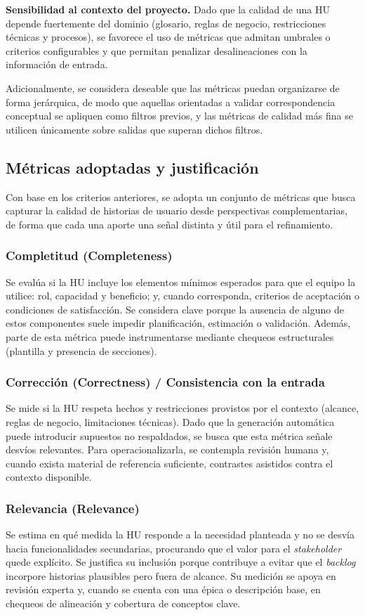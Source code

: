 \textbf{Sensibilidad al contexto del proyecto.} Dado que la calidad de una HU
depende fuertemente del dominio (glosario, reglas de negocio, restricciones
técnicas y procesos), se favorece el uso de métricas que admitan umbrales o
criterios configurables y que permitan penalizar desalineaciones con la
información de entrada.

Adicionalmente, se considera deseable que las métricas puedan organizarse de
forma jerárquica, de modo que aquellas orientadas a validar correspondencia
conceptual se apliquen como filtros previos, y las métricas de calidad más fina
se utilicen únicamente sobre salidas que superan dichos filtros.

\subsection{Métricas adoptadas y justificación}
Con base en los criterios anteriores, se adopta un conjunto de métricas que busca capturar la calidad de historias de usuario desde perspectivas complementarias, de forma que cada una aporte una señal distinta y útil para el refinamiento.

\subsubsection{Completitud (Completeness)}
Se evalúa si la HU incluye los elementos mínimos esperados para que el equipo la utilice: rol, capacidad y beneficio; y, cuando corresponda, criterios de aceptación o condiciones de satisfacción. Se considera clave porque la ausencia de alguno de estos componentes suele impedir planificación, estimación o validación. Además, parte de esta métrica puede instrumentarse mediante chequeos estructurales (plantilla y presencia de secciones).

\subsubsection{Corrección (Correctness) / Consistencia con la entrada}
Se mide si la HU respeta hechos y restricciones provistos por el contexto (alcance, reglas de negocio, limitaciones técnicas). Dado que la generación automática puede introducir supuestos no respaldados, se busca que esta métrica señale desvíos relevantes. Para operacionalizarla, se contempla revisión humana y, cuando exista material de referencia suficiente, contrastes asistidos contra el contexto disponible.

\subsubsection{Relevancia (Relevance)}
Se estima en qué medida la HU responde a la necesidad planteada y no se desvía hacia funcionalidades secundarias, procurando que el valor para el \textit{stakeholder} quede explícito. Se justifica su inclusión porque contribuye a evitar que el \textit{backlog} incorpore historias plausibles pero fuera de alcance. Su medición se apoya en revisión experta y, cuando se cuenta con una épica o descripción base, en chequeos de alineación y cobertura de conceptos clave.

